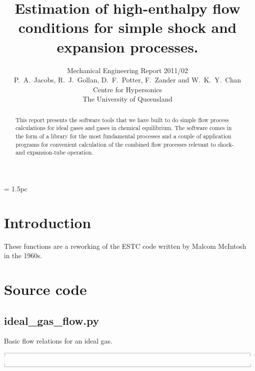\documentclass[10pt,a4paper]{article}
\title{
  Estimation of high-enthalpy flow conditions
  for simple shock and expansion processes.
}
\author{
  Mechanical Engineering Report 2011/02 \\
  P.~A.~Jacobs, R.~J.~Gollan, D.~F.~Potter, F.~Zander and W.~K.~Y.~Chan \\
  Centre for Hypersonics\\
  The University of Queensland
}
\newcommand{\topbar}{\ensuremath{
    \rule{0.1mm}{2.0mm} \rule[2.0mm]{159.5mm}{0.1mm} \rule{0.1mm}{2.0mm}
}}
\newcommand{\bottombar}{\ensuremath{
    \rule{0.1mm}{2.0mm} \rule{159.5mm}{0.1mm} \rule{0.1mm}{2.0mm}
}}
\begin{document}
\maketitle


\baselineskip = 1.5pc

\begin{abstract}
This report presents the software tools that we have built to do simple
flow process calculations for ideal gases and gases in chemical equilibrium.
The software comes in the form of a library for the most fundamental processes and
a couple of application programs for convenient calculation of 
the combined flow processes relevant to shock- and expansion-tube operation.
\end{abstract}


\newpage
\section{Introduction}
These functions are a reworking of the ESTC code written by Malcom McIntosh in the 1960s.





\newpage
\appendix
\section{Source code}
%
\subsection{ideal\_gas\_flow.py}
\label{ideal-gas-flow-py}
%
Basic flow relations for an ideal gas.

\scriptsize
\noindent\topbar

\bottombar
\normalsize
\end{document}
